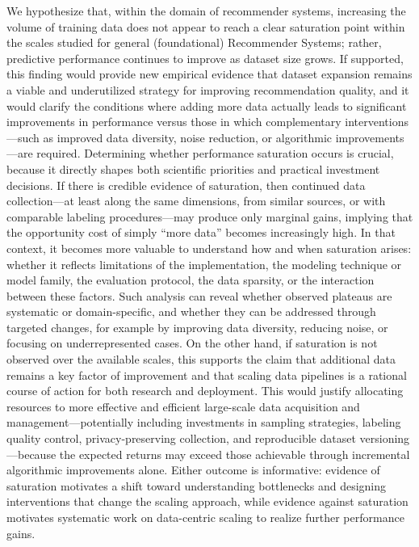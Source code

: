 \documentclass[12pt,a4paper]{article}
\begin{document}
We hypothesize that, within the domain of recommender systems, increasing the volume of training data does not appear to reach a clear saturation point within the scales studied for general (foundational) Recommender Systems; rather, predictive performance continues to improve as dataset size grows. If supported, this finding would provide new empirical evidence that dataset expansion remains a viable and underutilized strategy for improving recommendation quality, and it would clarify the conditions where adding more data actually leads to significant improvements in performance versus those in which complementary interventions—such as improved data diversity, noise reduction, or algorithmic improvements—are required. Determining whether performance saturation occurs is crucial, because it directly shapes both scientific priorities and practical investment decisions. If there is credible evidence of saturation, then continued data collection—at least along the same dimensions, from similar sources, or with comparable labeling procedures—may produce only marginal gains, implying that the opportunity cost of simply “more data” becomes increasingly high. In that context, it becomes more valuable to understand how and when saturation arises: whether it reflects limitations of the implementation, the modeling technique or model family, the evaluation protocol, the data sparsity, or the interaction between these factors. Such analysis can reveal whether observed plateaus are systematic or domain-specific, and whether they can be addressed through targeted changes, for example by improving data diversity, reducing noise, or focusing on underrepresented cases. On the other hand, if saturation is not observed over the available scales, this supports the claim that additional data remains a key factor of improvement and that scaling data pipelines is a rational course of action for both research and deployment. This would justify allocating resources to more effective and efficient large-scale data acquisition and management—potentially including investments in sampling strategies, labeling quality control, privacy-preserving collection, and reproducible dataset versioning—because the expected returns may exceed those achievable through incremental algorithmic improvements alone. Either outcome is informative: evidence of saturation motivates a shift toward understanding bottlenecks and designing interventions that change the scaling approach, while evidence against saturation motivates systematic work on data-centric scaling to realize further performance gains.
\end{document}
